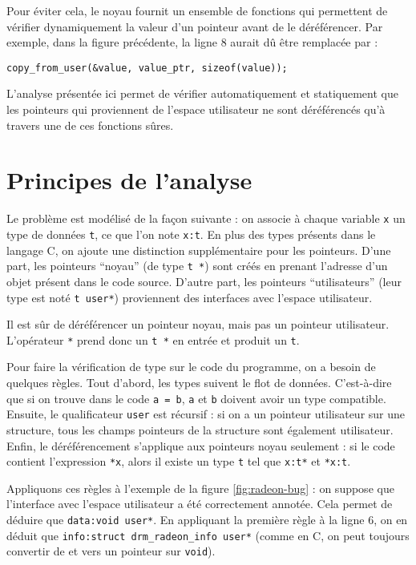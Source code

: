 Pour éviter cela, le noyau fournit un ensemble de fonctions qui permettent de
vérifier dynamiquement la valeur d'un pointeur avant de le déréférencer. Par
exemple, dans la figure précédente, la ligne 8 aurait dû être remplacée par :

\begin{Verbatim}
copy_from_user(&value, value_ptr, sizeof(value));
\end{Verbatim}

L'analyse présentée ici permet de vérifier automatiquement et statiquement que
les pointeurs qui proviennent de l'espace utilisateur ne sont déréférencés qu'à
travers une de ces fonctions sûres.

\section{Principes de l'analyse}

Le problème est modélisé de la façon suivante : on associe à chaque variable
\texttt{x} un type de données \texttt{t}, ce que l'on note \texttt{x:t}. En
plus des types présents dans le langage C, on ajoute une distinction
supplémentaire pour les pointeurs. D'une part, les pointeurs ``noyau'' (de type
\texttt{t~*}) sont créés en prenant l'adresse d'un objet présent dans le code
source. D'autre part, les pointeurs ``utilisateurs'' (leur type est noté
\texttt{t user*}) proviennent des interfaces avec l'espace utilisateur.

Il est sûr de déréférencer un pointeur noyau, mais pas un pointeur
utilisateur. L'opérateur \texttt{*} prend donc un \texttt{t *} en entrée
et produit un \texttt{t}.

Pour faire la vérification de type sur le code du programme, on a besoin de
quelques règles. Tout d'abord, les types suivent le flot de données.
C'est-à-dire que si on trouve dans le code \texttt{a = b}, \texttt{a} et
\texttt{b} doivent avoir un type compatible. Ensuite, le qualificateur
\texttt{user} est récursif : si on a un pointeur utilisateur sur une structure,
tous les champs pointeurs de la structure sont également utilisateur. Enfin, le
déréférencement s'applique aux pointeurs noyau seulement : si le code contient
l'expression \texttt{*x}, alors il existe un type \texttt{t} tel que
\texttt{x:t*} et \texttt{*x:t}.

Appliquons ces règles à l'exemple de la figure \ref{fig:radeon-bug} : on suppose
que l'interface avec l'espace utilisateur a été correctement annotée. Cela
permet de déduire que \texttt{data:void user*}. En appliquant la première règle
à la ligne 6, on en déduit que \texttt{info:struct drm\_radeon\_info user*}
(comme en C, on peut toujours convertir de et vers un pointeur sur
\texttt{void}).

